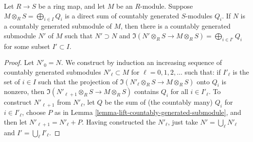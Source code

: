 \begin{lemma}
\label{lemma-adapted-submodule}
Let $R \to S$ be a ring map, and let $M$ be an $R$-module.  Suppose $M
\otimes_R S = \bigoplus_{i \in I} Q_i$ is a direct sum of countably generated
$S$-modules $Q_i$.  If $N$ is a countably generated submodule of $M$, then
there is a countably generated submodule $N'$ of $M$ such that $N' \supset N$
and $\Im(N' \otimes_R S \to M \otimes_R S) =
\bigoplus_{i \in I'} Q_i$ for some subset $I' \subset I$.
\end{lemma}

\begin{proof}
Let $N'_0 = N$.  We construct by induction an increasing sequence of countably
generated submodules $N'_{\ell} \subset M$ for $\ell = 0, 1, 2, \ldots$
such that: if $I'_{\ell}$ is the set of $i \in I$ such that the projection of
$\Im(N'_{\ell} \otimes_R S \to M \otimes_R S)$ onto $Q_i$ is
nonzero, then $\Im(N'_{\ell + 1} \otimes_R S \to M \otimes_R
S)$ contains $Q_i$ for all $i \in I'_{\ell}$.  To construct $N'_{\ell + 1}$
from $N'_\ell$, let $Q$ be the sum of (the countably many) $Q_i$ for
$i \in I'_{\ell}$, choose $P$ as in Lemma
\ref{lemma-lift-countably-generated-submodule}, and then let $N'_{\ell + 1} =
N'_{\ell} + P$.  Having constructed the $N'_{\ell}$, just take $N' =
\bigcup_{\ell} N'_{\ell}$ and $I' = \bigcup_{\ell} I'_{\ell}$.
\end{proof}
